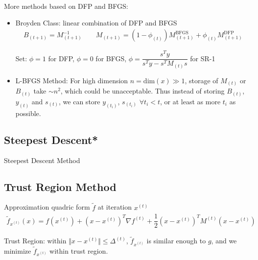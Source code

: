     \begin{point}
        More methods based on DFP and BFGS:
    \end{point}
    
\begin{itemize}[topsep=2pt,itemsep=0pt]
    \item Broyden Class: linear combination of DFP and BFGS
    \begin{align}
        B_{(t+1)}=M_{(t+1)}^{-1}\qquad M _{(t+1)}=(1-\phi_{(t)})M_{(t+1)}^\mathrm{BFGS}+\phi _{(t)}M_{(t+1)}^\mathrm{DFP} 
    \end{align}

    Set: $ \phi =1 $ for DFP, $ \phi =0 $ for BFGS, $ \phi =\dfrac{s^Ty}{s^Ty-s^TM_{(t)}s} $ for SR-1
    
    
    \item L-BFGS Method: For high dimension $ n=\mathrm{dim}(x)\gg 1  $, storage of $ M_{(t)} $ or $ B_{(t)} $ take $ \sim n^2 $, which could be unacceptable. Thus instead of storing $ B_{(t)} $, $ y_{(t)} $ and $ s_{(t)} $, we can store $ y_{(t_i)} $, $ s_{(t_i)} $ $ \forall t_i<t $, or at least as more $ t_i $ as possible.

\end{itemize}

\subsection{Steepest Descent*}
\hypertarget{SteepestDescent}{Steepest Descent Method}






\subsection{Trust Region Method}\label{SubSubSectionTrustRegion}
\hypertarget{TrustRegion}{}
    Approximation quadric form $ \tilde{f} $ at iteration $ x^{(t)} $
    \begin{align}
        \tilde{f}_{x^{(t)}}(x)=f(x^{(t)})+ \left(x-x^{(t)}\right)^T\nabla f^{(t)}+\dfrac{1}{2}\left(x-x^{(t)}\right)^TM^{(t)}\left(x-x^{(t)}\right)
    \end{align}
    
    Trust Region: within $ \Vert x-x^{(t)} \Vert\leq \Delta ^{(t)}  $, $ \tilde{f}_{x^{(t)}}  $ is similar enough to $ g $, and we minimize $ \tilde{f}_{x^{(t)}} $ within trust region.

